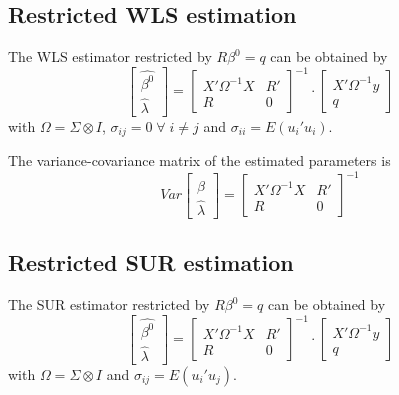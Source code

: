 \subsection{Restricted WLS estimation}

The WLS estimator restricted by $R \beta^0 = q$ can be obtained by
\begin{equation}
   \left[ \begin{array}{c}
      \widehat{\beta^0} \\ \widehat{\lambda}
   \end{array} \right]
   =
   \left[ \begin{array}{cc}
      X' \Omega^{-1} X & R' \\ 
      R & 0
   \end{array} \right]^{-1}
   \cdot
   \left[ \begin{array}{c}
      X' \Omega^{-1} y \\ q 
   \end{array} \right]
\end{equation}
with $\Omega = \Sigma \otimes I$, 
$\sigma_{ij} = 0 \; \forall \; i \neq j$ and
$\sigma_{ii} = E \left( u_i' u_i \right)$.

The variance-covariance matrix of the estimated parameters is
\begin{equation}
   Var 
   \left[ \begin{array}{c}
      \widehat{\beta} \\ \widehat{\lambda}
   \end{array} \right] 
   = 
   \left[ \begin{array}{cc}
      X' \Omega^{-1} X & R' \\ 
      R & 0
   \end{array} \right]^{-1}
\end{equation}

\subsection{Restricted SUR estimation}

The SUR estimator restricted by $R \beta^0 = q$ can be obtained by
\begin{equation}
   \left[ \begin{array}{c}
      \widehat{\beta^0} \\ \widehat{\lambda}
   \end{array} \right]
   =
   \left[ \begin{array}{cc}
      X' \Omega^{-1} X & R' \\ 
      R & 0
   \end{array} \right]^{-1}
   \cdot
   \left[ \begin{array}{c}
      X' \Omega^{-1} y \\ q 
   \end{array} \right]
\end{equation}
with $\Omega = \Sigma \otimes I$ and
$\sigma_{ij} = E \left( u_i' u_j \right)$.

